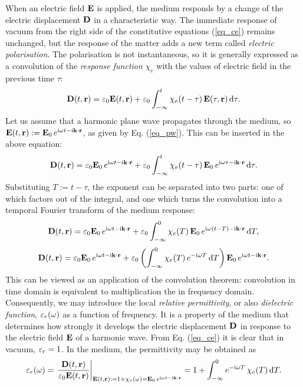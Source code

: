 When an electric field $\mathbf{E}$ is applied, the medium responds by a change of the electric displacement $\mathbf{D}$ in a characteristic way. 
The immediate response of vacuum from the right side of the constitutive equations (\ref{eq_ce}) remains unchanged, but the response of the matter adds a new term called \textit{electric polarisation}. The polarisation is not instantaneous, so it is generally expressed as a convolution of the \textit{response function} $\chi_e$ with the values of electric field in the previous time $\tau$:
\begin{equation} \mathbf{D}(t,{\mathbf{r}}) = \varepsilon_0 \mathbf{E}(t,{\mathbf{r}}) + \varepsilon_0 \int_{-\infty}^{t}\chi_e(t-\tau)\, \mathbf{E}(\tau,{\mathbf{r}})\,\mbox{d}\tau. \label{eq_loc_chi_convol}\end{equation}
Let us assume that a harmonic plane wave propagates through the medium, so $\mathbf{E}(t, {\mathbf{r}}) := \mathbf{E}_0 \, e^{{\mathrm i}\omega t - {\mathrm i}{\mathbf{k}}\cdot{\mathbf{r}}}$, as given by Eq. (\ref{eq_pw}). This can be inserted in the above equation:
\begin{equation} \mathbf{D}(t,{\mathbf{r}}) = \varepsilon_0 \mathbf{E}_0 \, e^{{\mathrm i}\omega t - {\mathrm i}{\mathbf{k}}\cdot{\mathbf{r}}} + \varepsilon_0 \int_{-\infty}^{t} \chi_e(t-\tau) \, \mathbf{E}_0 \, e^{{\mathrm i}\omega \tau - {\mathrm i}{\mathbf{k}}\cdot{\mathbf{r}}} \,\mbox{d}\tau. \label{eq_chi_convol_harm}\end{equation}
Substituting $T:=t-\tau$, the exponent can be separated into two parts: one of which factors out of the integral, and one which turns the convolution into a temporal Fourier transform of the medium response:
$$				 \mathbf{D}(t,{\mathbf{r}}) = \varepsilon_0 \mathbf{E}_0 \, e^{{\mathrm i}\omega t - {\mathrm i}{\mathbf{k}}\cdot{\mathbf{r}}} + \varepsilon_0 \int_{-\infty}^{0} \chi_e(T) \, \mathbf{E}_0 \, e^{{\mathrm i}\omega (t - T) - {\mathrm i}{\mathbf{k}}\cdot{\mathbf{r}}} \,\mbox{d}T,$$
$$				 \mathbf{D}(t,{\mathbf{r}}) = \varepsilon_0 \mathbf{E}_0 \, e^{{\mathrm i}\omega t - {\mathrm i}{\mathbf{k}}\cdot{\mathbf{r}}} + \varepsilon_0 \left( \int_{-\infty}^{0} \chi_e(T)  \, e^{-{\mathrm i}\omega T}\,\mbox{d}T  \right) \mathbf{E}_0 \, e^{{\mathrm i}\omega t - {\mathrm i}{\mathbf{k}}\cdot{\mathbf{r}}}.$$
This can be viewed as an application of the convolution theorem: convolution in time domain is equivalent to multiplication the in frequency domain.  %
Consequently, we may introduce the local \textit{relative permittivity}, or also \textit{dielectric function}, $\varepsilon_r(\omega)$ as a function of frequency. It is a property of the medium that determines how strongly it develops the electric displacement $\mathbf{D}$ in response to the electric field $\mathbf{E}$ of a harmonic wave.
From Eq. (\ref{eq_ce}) it is clear that in vacuum,  $\varepsilon_r = 1$. In the medium, the permittivity may be obtained as
\begin{equation}  \varepsilon_r(\omega) = \left.\frac{\mathbf{D}(t,{\mathbf{r}})}{\varepsilon_0 \mathbf{E}(t,{\mathbf{r}})} \right|_{\mathbf{E}(t, {\mathbf{r}}) := 1 + \chi_e(\omega) = \mathbf{E}_0 \, e^{{\mathrm i}\omega t - {\mathrm i}{\mathbf{k}}\cdot{\mathbf{r}}}} = 1 + \int_{-\infty}^{0} e^{-{\mathrm i}\omega T} \,\chi_e(T) \,\mbox{d}T. \label{eq_eps_loc}\end{equation}

